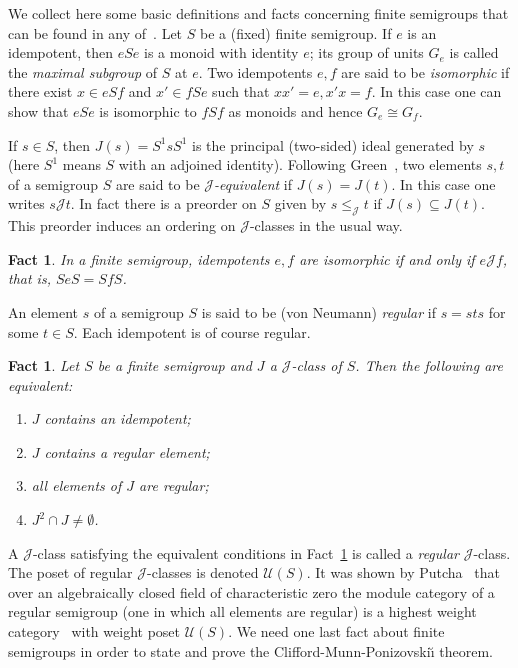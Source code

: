 \documentclass[reqno,11pt]{amsart}
\def\J{\mathrel{{\mathscr J}}} %
\newtheorem{Fact}[Thm]{Fact}
\numberwithin{equation}{section}
\begin{document}
We collect here some basic definitions and facts concerning finite
semigroups that can be found in any of~\cite{Arbib,CP,qtheor}.  Let
$S$ be a (fixed) finite semigroup.  If $e$ is an idempotent, then
$eSe$ is a monoid with
identity $e$; its group of units $G_e$ is called the \emph{maximal
  subgroup} of $S$ at $e$.  Two idempotents $e,f$ are said to be
\emph{isomorphic} if there exist $x\in eSf$ and
$x'\in fSe$ such that $xx'=e, x'x=f$.  In this case one can show that
$eSe$ is isomorphic to $fSf$ as
monoids and hence $G_e\cong G_f$.

If $s\in S$, then $J(s) = S^1sS^1$ is the principal (two-sided) ideal
generated by $s$ (here $S^1$ means $S$ with an adjoined identity).
Following Green~\cite{Green}, two elements $s,t$ of a semigroup $S$
are said to be \emph{$\J$-equivalent} if $J(s)=J(t)$.  In this case
one writes $s\J t$.   In fact there is a preorder on $S$ given by
$s\leq_{\J} t$ if $J(s)\subseteq J(t)$.  This preorder induces an
ordering on $\J$-classes in the usual way.

\begin{Fact}
In a finite semigroup, idempotents $e,f$ are isomorphic if and only if $e\J f$, that is, $SeS=SfS$.
\end{Fact}

An element $s$ of a semigroup $S$ is said to be (von Neumann)
\emph{regular} if $s=sts$ for some $t\in S$.  Each idempotent is of
course regular.

\begin{Fact}\label{regularJclass}
Let $S$ be a finite semigroup and $J$ a $\J$-class of $S$.  Then the
following are equivalent:
\begin{enumerate}
\item $J$ contains an idempotent;
\item $J$ contains a regular element;
\item all elements of $J$ are regular;
\item $J^2\cap J\neq \emptyset$.
\end{enumerate}
\end{Fact}

A $\J$-class satisfying the equivalent conditions in
Fact~\ref{regularJclass} is called a \emph{regular} $\J$-class.  The
poset of regular $\J$-classes is denoted $\mathscr U(S)$.  It was
shown by Putcha~\cite{Putcharep3} that over an algebraically closed 
field of characteristic zero the module category of a regular semigroup 
(one in which all elements are regular)  is a highest
weight category~\cite{quasihered} with weight poset $\mathscr U(S)$.  We
need one last fact about finite semigroups in order to state and prove
the Clifford-Munn-Ponizovski{\u\i} theorem.
\end{document}
